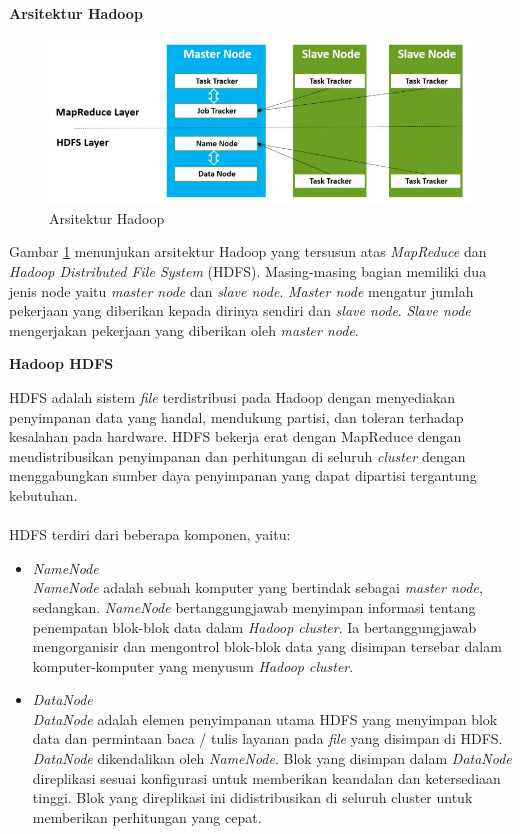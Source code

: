\documentclass[a4paper,twoside]{article}
\begin{document}
\begin{enumerate}
\textbf{Arsitektur Hadoop}

\begin{figure}[H]
	\centering
	\includegraphics[scale=0.65]{arsitektur_hadoop}
	\caption{Arsitektur Hadoop}
	\label{fig:arsitektur_hadoop}
\end{figure}
Gambar \ref{fig:arsitektur_hadoop} menunjukan arsitektur Hadoop yang tersusun atas \textit{MapReduce} dan \textit{Hadoop Distributed File System} (HDFS). Masing-masing bagian memiliki dua jenis node yaitu \textit{master node} dan \textit{slave node}. \textit{Master node} mengatur jumlah pekerjaan yang diberikan kepada dirinya sendiri dan \textit{slave node}. \textit{Slave node} mengerjakan pekerjaan yang diberikan oleh \textit{master node}.


\textbf{Hadoop HDFS}

HDFS adalah sistem \textit{file} terdistribusi pada Hadoop dengan menyediakan penyimpanan data yang handal, mendukung partisi, dan toleran terhadap kesalahan pada hardware. HDFS bekerja erat dengan MapReduce dengan mendistribusikan penyimpanan dan perhitungan di seluruh \textit{cluster} dengan menggabungkan sumber daya penyimpanan yang dapat dipartisi tergantung kebutuhan. 
\\\\
HDFS terdiri dari beberapa komponen, yaitu:

\begin{itemize}
\item \textit{NameNode}\\
\textit{NameNode} adalah sebuah komputer yang bertindak sebagai \textit{master node}, sedangkan. \textit{NameNode} bertanggungjawab menyimpan informasi tentang penempatan blok-blok data dalam \textit{Hadoop cluster}. Ia bertanggungjawab mengorganisir dan mengontrol blok-blok data yang disimpan tersebar dalam komputer-komputer yang menyusun \textit{Hadoop cluster}. 

\item \textit{DataNode}\\
\textit{DataNode} adalah elemen penyimpanan utama HDFS yang menyimpan blok data dan permintaan baca / tulis layanan pada \textit{file} yang disimpan di HDFS. \textit{DataNode} dikendalikan oleh \textit{NameNode}. Blok yang disimpan dalam \textit{DataNode} direplikasi sesuai konfigurasi untuk memberikan keandalan dan ketersediaan tinggi. Blok yang direplikasi ini didistribusikan di seluruh cluster untuk memberikan perhitungan yang cepat.
\end{itemize}


\end{enumerate}
\end{document}
